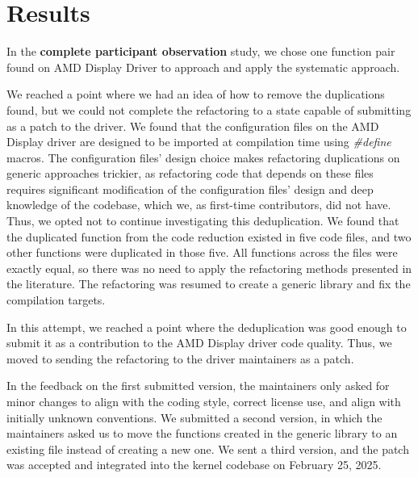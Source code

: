\documentclass[10pt,conference]{IEEEtran}
\begin{document}
\section{Results}

In the \textbf{complete participant observation} study, we chose one function pair found on AMD Display Driver to approach and apply the systematic approach.

We reached a point where we had an idea of how to remove the duplications found, but we could not complete the refactoring to a state capable of submitting as a patch to the driver. We found that the configuration files on the AMD Display driver are designed to be imported at compilation time using \textit{\#define} macros. The configuration files' design choice makes refactoring duplications on generic approaches trickier, as refactoring code that depends on these files requires significant modification of the configuration files' design and deep knowledge of the codebase, which we, as first-time contributors, did not have. Thus, we opted not to continue investigating this deduplication. We found that the duplicated function from the code reduction existed in five code files, and two other functions were duplicated in those five. All functions across the files were exactly equal, so there was no need to apply the refactoring methods presented in the literature. The refactoring was resumed to create a generic library and fix the compilation targets.

In this attempt, we reached a point where the deduplication was good enough to submit it as a contribution to the AMD Display driver code quality. Thus, we moved to sending the refactoring to the driver maintainers as a patch.

In the feedback on the first submitted version, the maintainers only asked for minor changes to align with the coding style, correct license use, and align with initially unknown conventions. We submitted a second version, in which the maintainers asked us to move the functions created in the generic library to an existing file instead of creating a new one. We sent a third version, and the patch was accepted and integrated into the kernel codebase on February 25, 2025.
\end{document}
